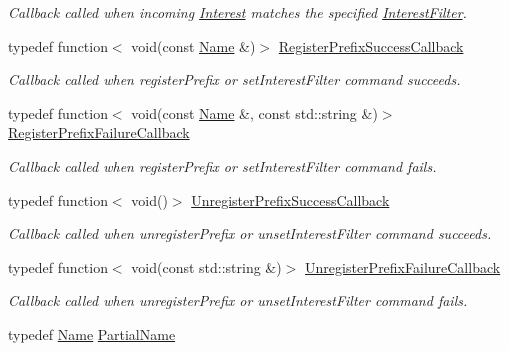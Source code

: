 \begin{DoxyCompactItemize}
\begin{DoxyCompactList}\small\item\em Callback called when incoming \hyperlink{classndn_1_1Interest}{Interest} matches the specified \hyperlink{classndn_1_1InterestFilter}{Interest\+Filter}. \end{DoxyCompactList}\item 
typedef function$<$ void(const \hyperlink{classndn_1_1Name}{Name} \&)$>$ \hyperlink{namespacendn_a80b158f94737f73bec3f9af27161e899}{Register\+Prefix\+Success\+Callback}\hypertarget{namespacendn_a80b158f94737f73bec3f9af27161e899}{}\label{namespacendn_a80b158f94737f73bec3f9af27161e899}

\begin{DoxyCompactList}\small\item\em Callback called when register\+Prefix or set\+Interest\+Filter command succeeds. \end{DoxyCompactList}\item 
typedef function$<$ void(const \hyperlink{classndn_1_1Name}{Name} \&, const std\+::string \&)$>$ \hyperlink{namespacendn_a691d213d0f708593217feeae517f3e45}{Register\+Prefix\+Failure\+Callback}\hypertarget{namespacendn_a691d213d0f708593217feeae517f3e45}{}\label{namespacendn_a691d213d0f708593217feeae517f3e45}

\begin{DoxyCompactList}\small\item\em Callback called when register\+Prefix or set\+Interest\+Filter command fails. \end{DoxyCompactList}\item 
typedef function$<$ void()$>$ \hyperlink{namespacendn_a6781fc026448072c22454e6af8b946e0}{Unregister\+Prefix\+Success\+Callback}\hypertarget{namespacendn_a6781fc026448072c22454e6af8b946e0}{}\label{namespacendn_a6781fc026448072c22454e6af8b946e0}

\begin{DoxyCompactList}\small\item\em Callback called when unregister\+Prefix or unset\+Interest\+Filter command succeeds. \end{DoxyCompactList}\item 
typedef function$<$ void(const std\+::string \&)$>$ \hyperlink{namespacendn_a1d6036d735c4c3504dad4f56ed174e5d}{Unregister\+Prefix\+Failure\+Callback}\hypertarget{namespacendn_a1d6036d735c4c3504dad4f56ed174e5d}{}\label{namespacendn_a1d6036d735c4c3504dad4f56ed174e5d}

\begin{DoxyCompactList}\small\item\em Callback called when unregister\+Prefix or unset\+Interest\+Filter command fails. \end{DoxyCompactList}\item 
typedef \hyperlink{classndn_1_1Name}{Name} \hyperlink{namespacendn_a687f9be727f562d4d77b9b4752e90140}{Partial\+Name}\hypertarget{namespacendn_a687f9be727f562d4d77b9b4752e90140}{}\label{namespacendn_a687f9be727f562d4d77b9b4752e90140}


\end{DoxyCompactItemize}

